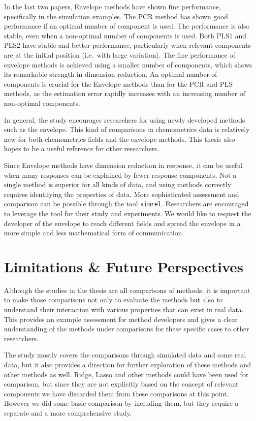 \documentclass[11pt,twoside,openright,titlepage,
  headinclude,footinclude,BCOR=5mm,
  numbers=noenddot,cleardoublepage=empty,
  tablecaptionabove, dottedtoc,
  bibliography=totoc,paper=a4]{scrreprt}
\begin{document}
In the last two papers, Envelope methods have shown fine performance, specifically in the simulation examples. The PCR method has shown good performance if an optimal number of component is used. The performance is also stable, even when a non-optimal number of components is used. Both PLS1 and PLS2 have stable and better performance, particularly when relevant components are at the initial position (i.e.~with large variation). The fine performance of envelope methods is achieved using a smaller number of components, which shows its remarkable strength in dimension reduction. An optimal number of components is crucial for the Envelope methods than for the PCR and PLS methods, as the estimation error rapidly increases with an increasing number of non-optimal components.

In general, the study encourages researchers for using newly developed methods such as the envelope. This kind of comparisons in chemometrics data is relatively new for both chemometrics fields and the envelope methods. This thesis also hopes to be a useful reference for other researchers.

Since Envelope methods have dimension reduction in response, it can be useful when many responses can be explained by fewer response components. Not a single method is superior for all kinds of data, and using methods correctly requires identifying the properties of data. More sophisticated assessment and comparison can be possible through the tool \texttt{simrel}. Researchers are encouraged to leverage the tool for their study and experiments. We would like to request the developer of the envelope to reach different fields and spread the envelope in a more simple and less mathematical form of communication.

\hypertarget{limitations-future-perspectives}{%
\chapter{Limitations \& Future Perspectives}\label{limitations-future-perspectives}}

Although the studies in the thesis are all comparisons of methods, it is important to make those comparisons not only to evaluate the methods but also to understand their interaction with various properties that can exist in real data. This provides an example assessment for method developers and gives a clear understanding of the methods under comparisons for these specific cases to other researchers.

The study mostly covers the comparisons through simulated data and some real data, but it also provides a direction for further exploration of these methods and other methods as well. Ridge, Lasso and other methods could have been used for comparison, but since they are not explicitly based on the concept of relevant components we have discarded them from these comparisons at this point. However we did some basic comparison by including them, but they require a separate and a more comprehensive study.
\end{document}
